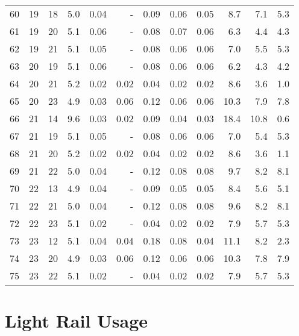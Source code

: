 \begin{small}
\begin{longtable}[c]{lrrrrr|rrr|rrr}
60 & 19 & 18 & 5.0 & 0.04 & - & 0.09 & 0.06 & 0.05 & 8.7 & 7.1 & 5.3 \\
61 & 19 & 20 & 5.1 & 0.06 & - & 0.08 & 0.07 & 0.06 & 6.3 & 4.4 & 4.3 \\
62 & 19 & 21 & 5.1 & 0.05 & - & 0.08 & 0.06 & 0.06 & 7.0 & 5.5 & 5.3 \\
63 & 20 & 19 & 5.1 & 0.06 & - & 0.08 & 0.06 & 0.06 & 6.2 & 4.3 & 4.2 \\
64 & 20 & 21 & 5.2 & 0.02 & 0.02 & 0.04 & 0.02 & 0.02 & 8.6 & 3.6 & 1.0 \\
65 & 20 & 23 & 4.9 & 0.03 & 0.06 & 0.12 & 0.06 & 0.06 & 10.3 & 7.9 & 7.8 \\
66 & 21 & 14 & 9.6 & 0.03 & 0.02 & 0.09 & 0.04 & 0.03 & 18.4 & 10.8 & 0.6 \\
67 & 21 & 19 & 5.1 & 0.05 & - & 0.08 & 0.06 & 0.06 & 7.0 & 5.4 & 5.3 \\
68 & 21 & 20 & 5.2 & 0.02 & 0.02 & 0.04 & 0.02 & 0.02 & 8.6 & 3.6 & 1.1 \\
69 & 21 & 22 & 5.0 & 0.04 & - & 0.12 & 0.08 & 0.08 & 9.7 & 8.2 & 8.1 \\
70 & 22 & 13 & 4.9 & 0.04 & - & 0.09 & 0.05 & 0.05 & 8.4 & 5.6 & 5.1 \\
71 & 22 & 21 & 5.0 & 0.04 & - & 0.12 & 0.08 & 0.08 & 9.6 & 8.2 & 8.1 \\
72 & 22 & 23 & 5.1 & 0.02 & - & 0.04 & 0.02 & 0.02 & 7.9 & 5.7 & 5.3 \\
73 & 23 & 12 & 5.1 & 0.04 & 0.04 & 0.18 & 0.08 & 0.04 & 11.1 & 8.2 & 2.3 \\
74 & 23 & 20 & 4.9 & 0.03 & 0.06 & 0.12 & 0.06 & 0.06 & 10.3 & 7.8 & 7.9 \\
75 & 23 & 22 & 5.1 & 0.02 & - & 0.04 & 0.02 & 0.02 & 7.9 & 5.7 & 5.3 \\ \bottomrule
\end{longtable}
\end{small}


\newpage
\section{Light Rail Usage}
\label{sec:flow_rail}

